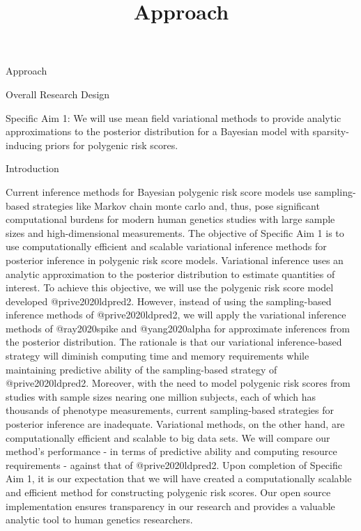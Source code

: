 \documentclass[
  letterpaper,
  DIV=11,
  numbers=noendperiod]{scrartcl}
\title{Approach}
\author{}
\date{}
\begin{document}
\maketitle
\ifdefined\Shaded\renewenvironment{Shaded}{\begin{tcolorbox}[sharp corners, interior hidden, frame hidden, borderline west={3pt}{0pt}{shadecolor}, breakable, boxrule=0pt, enhanced]}{\end{tcolorbox}}\fi

Approach

Overall Research Design

Specific Aim 1: We will use mean field variational methods to provide
analytic approximations to the posterior distribution for a Bayesian
model with sparsity-inducing priors for polygenic risk scores.

Introduction

Current inference methods for Bayesian polygenic risk score models use
sampling-based strategies like Markov chain monte carlo and, thus, pose
significant computational burdens for modern human genetics studies with
large sample sizes and high-dimensional measurements. The objective of
Specific Aim 1 is to use computationally efficient and scalable
variational inference methods for posterior inference in polygenic risk
score models. Variational inference uses an analytic approximation to
the posterior distribution to estimate quantities of interest. To
achieve this objective, we will use the polygenic risk score model
developed @prive2020ldpred2. However, instead of using the
sampling-based inference methods of @prive2020ldpred2, we will apply the
variational inference methods of @ray2020spike and @yang2020alpha for
approximate inferences from the posterior distribution. The rationale is
that our variational inference-based strategy will diminish computing
time and memory requirements while maintaining predictive ability of the
sampling-based strategy of @prive2020ldpred2. Moreover, with the need to
model polygenic risk scores from studies with sample sizes nearing one
million subjects, each of which has thousands of phenotype measurements,
current sampling-based strategies for posterior inference are
inadequate. Variational methods, on the other hand, are computationally
efficient and scalable to big data sets. We will compare our method's
performance - in terms of predictive ability and computing resource
requirements - against that of @prive2020ldpred2. Upon completion of
Specific Aim 1, it is our expectation that we will have created a
computationally scalable and efficient method for constructing polygenic
risk scores. Our open source implementation ensures transparency in our
research and provides a valuable analytic tool to human genetics
researchers.
\end{document}

